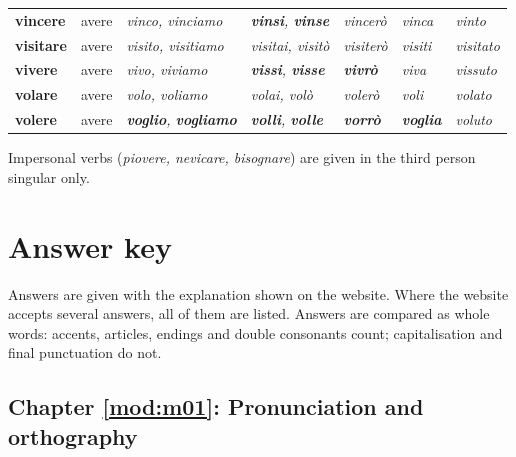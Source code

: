 \documentclass[11pt,a4paper,twoside,openright]{book}
\newcommand{\irr}[1]{{\color{exccol}\bfseries #1}}
\begin{document}
{\begin{xltabular}{\linewidth}{@{}>{\raggedright\arraybackslash}p{2.7cm} l L L l >{\raggedright\arraybackslash}p{1.9cm} l@{}}
\textbf{vincere} & avere & \textit{vinco, vinciamo} & \textit{\irr{vinsi}, \irr{vinse}} & \textit{vincerò} & \textit{vinca} & \textit{vinto} \\
\textbf{visitare} & avere & \textit{visito, visitiamo} & \textit{visitai, visitò} & \textit{visiterò} & \textit{visiti} & \textit{visitato} \\
\textbf{vivere} & avere & \textit{vivo, viviamo} & \textit{\irr{vissi}, \irr{visse}} & \textit{\irr{vivrò}} & \textit{viva} & \textit{vissuto} \\
\textbf{volare} & avere & \textit{volo, voliamo} & \textit{volai, volò} & \textit{volerò} & \textit{voli} & \textit{volato} \\
\textbf{volere} & avere & \textit{\irr{voglio}, \irr{vogliamo}} & \textit{\irr{volli}, \irr{volle}} & \textit{\irr{vorrò}} & \textit{\irr{voglia}} & \textit{voluto} \\
\bottomrule
\end{xltabular}}
{\footnotesize\color{muted}Impersonal verbs (\textit{piovere, nevicare, bisognare}) are given in the third person singular only.}\par

\appendix
{}

\chapter{Answer key}\label{answers}
Answers are given with the explanation shown on the website. Where the website accepts several answers, all of them are listed. Answers are compared as whole words: accents, articles, endings and double consonants count; capitalisation and final punctuation do not.\par

\section*{Chapter \ref{mod:m01}: Pronunciation and orthography}
\end{document}
